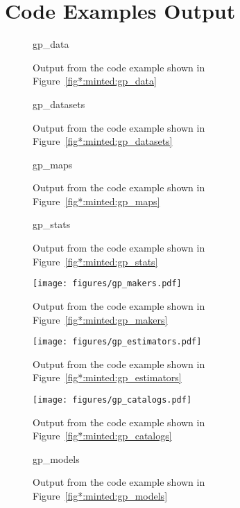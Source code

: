 \documentclass[longauth]{aa}
\begin{document}



\appendix
\section{Code Examples Output}

\begin{figure}[!ht]
	\small
	{gp_data}
	\caption{Output from the code example shown in Figure~\ref{fig*:minted:gp_data}}
	\label{fig:code_example_gp_data}
\end{figure}


\begin{figure}[!ht]
	\small
	{gp_datasets}
	\caption{Output from the code example shown in Figure~\ref{fig*:minted:gp_datasets}}
	\label{fig:code_example_gp_datasets}
\end{figure}

\begin{figure}[!ht]
	\small
	{gp_maps}
	\caption{Output from the code example shown in Figure~\ref{fig*:minted:gp_maps}}
	\label{fig:code_example_gp_maps}
\end{figure}


\begin{figure}[!ht]
	\small
	{gp_stats}
	\caption{Output from the code example shown in Figure~\ref{fig*:minted:gp_stats}}
	\label{fig:code_example_gp_stats}
\end{figure}


\begin{figure*}[!ht]
	\centering
	\texttt{[image: figures/gp\_makers.pdf]}
	\caption{Output from the code example shown in Figure~\ref{fig*:minted:gp_makers}}
	\label{fig:code_example_gp_makers}
\end{figure*}


\begin{figure*}[!ht]
	\centering
	\texttt{[image: figures/gp\_estimators.pdf]}
	\caption{Output from the code example shown in Figure~\ref{fig*:minted:gp_estimators}}
	\label{fig:code_example_gp_estimators}
\end{figure*}


\begin{figure*}[!ht]
	\centering
	\texttt{[image: figures/gp\_catalogs.pdf]}
	\caption{Output from the code example shown in Figure~\ref{fig*:minted:gp_catalogs}}
	\label{fig:code_example_gp_catalogs}
\end{figure*}

\begin{figure}[!ht]
	\small
	{gp_models}
	\caption{Output from the code example shown in Figure~\ref{fig*:minted:gp_models}}
	\label{fig:code_example_gp_models}
\end{figure}
\end{document}
